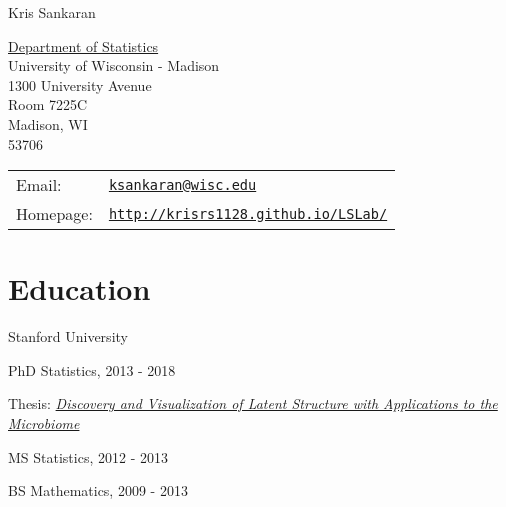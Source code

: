 \documentclass[letterpaper]{article}
\def\name{Kris Sankaran}
\renewenvironment{itemize}{
  \begin{list}{}{
    \setlength{\leftmargin}{1.5em}
  }
}{
  \end{list}
}
\begin{document}
{\huge \name}


\vspace{0.25in}

\begin{minipage}{0.45\linewidth}
  \href{https://stat.wisc.edu/}{Department of Statistics} \\
  University of Wisconsin - Madison \\
  1300 University Avenue \\
  Room 7225C \\
  Madison, WI \\
  53706
\end{minipage}
\begin{minipage}{0.45\linewidth}
  \begin{tabular}{ll}
    Email: & \href{mailto:ksankaran@wisc.edu}{\tt ksankaran@wisc.edu} \\
    Homepage: & \href{http://krisrs1128.github.io/LSLab/}{\tt http://krisrs1128.github.io/LSLab/} \\
  \end{tabular}
\end{minipage}

\section*{Education}
Stanford University
\begin{itemize}
  \item PhD Statistics, 2013 - 2018
    \begin{itemize}
    \item Thesis: \textit{\href{https://searchworks.stanford.edu/view/12375828}{Discovery and Visualization of Latent Structure with Applications to the Microbiome}}
    \end{itemize}
  \item MS Statistics, 2012 - 2013
  \item BS Mathematics, 2009 - 2013
\end{itemize}
\end{document}
